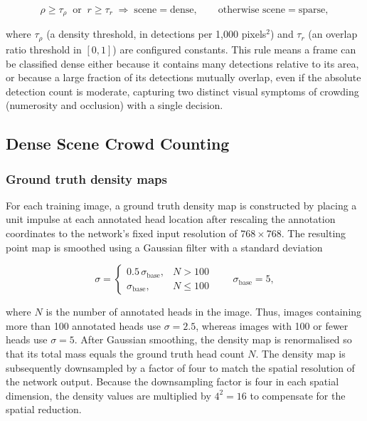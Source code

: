 \begin{equation}
	\rho \ge \tau_{\rho} \;\;\text{or}\;\; r \ge \tau_{r} \;\Rightarrow\; \text{scene} = \text{dense}, \qquad \text{otherwise scene} = \text{sparse},
\end{equation}

where $\tau_{\rho}$ (a density threshold, in detections per 1{,}000 pixels$^2$) and $\tau_{r}$ (an overlap ratio threshold in $[0,1]$) are configured constants. This rule means a frame can be classified dense either because it contains many detections relative to its area, or because a large fraction of its detections mutually overlap, even if the absolute detection count is moderate, capturing two distinct visual symptoms of crowding (numerosity and occlusion) with a single decision. 

\subsection{Dense Scene Crowd Counting}
\label{sec:dense}

\subsubsection{Ground truth density maps}

For each training image, a ground truth density map is constructed by placing a unit impulse at each annotated head location after rescaling the annotation coordinates to the network's fixed input resolution of $768{\times}768$. The resulting point map is smoothed using a Gaussian filter with a standard deviation

\begin{equation}
	\sigma =
	\begin{cases}
		0.5\,\sigma_{\text{base}}, & N > 100 \\
		\sigma_{\text{base}}, & N \le 100
	\end{cases}
	\qquad \sigma_{\text{base}} = 5,
\end{equation}

where $N$ is the number of annotated heads in the image. Thus, images containing more than 100 annotated heads use $\sigma=2.5$, whereas images with 100 or fewer heads use $\sigma=5$. After Gaussian smoothing, the density map is renormalised so that its total mass equals the ground truth head count $N$. The density map is subsequently downsampled by a factor of four to match the spatial resolution of the network output. Because the downsampling factor is four in each spatial dimension, the density values are multiplied by $4^2=16$ to compensate for the spatial reduction.

